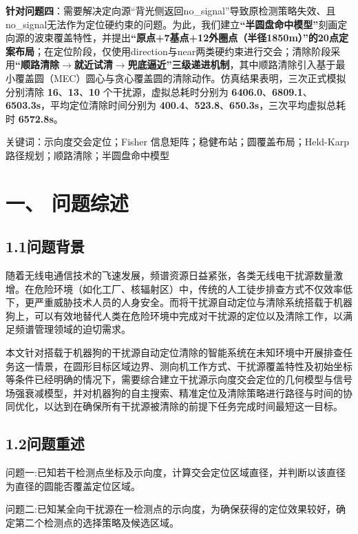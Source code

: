\documentclass[UTF8, zihao=5,AutoFakeBold=2]{ctexart}
\begin{document}
\textbf{针对问题四}：需要解决定向源“背光侧返回no\_signal”导致原检测策略失效、且no\_signal无法作为定位硬约束的问题。为此，我们建立\textbf{“半圆盘命中模型”}刻画定向源的波束覆盖特性，并提出\textbf{“原点+7基点+12外圈点（半径1850m）”的20点定案布局}；在定位阶段，仅使用direction与near两类硬约束进行交会；清除阶段采用\textbf{“顺路清除\(\to\)就近试清\(\to\)兜底逼近”三级递进机制}，其中顺路清除引入基于最小覆盖圆（MEC）圆心与贪心覆盖圆的清除动作。仿真结果表明，三次正式模拟分别清除 \textbf{16}、\textbf{13}、\textbf{10} 个干扰源，虚拟总耗时分别为 \textbf{6406.0}、\textbf{6809.1}、\textbf{6503.3s}，平均定位清除时间分别为 \textbf{400.4}、\textbf{523.8}、\textbf{650.3s}，三次平均虚拟总耗时 \textbf{6572.8s}。

	\vspace{1cm}
	{\heiti 关键词：}示向度交会定位；Fisher 信息矩阵；稳健布站；圆覆盖布局；Held-Karp 路径规划；顺路清除；半圆盘命中模型

\newpage
\section*{一、 问题综述}
	\subsection*{1.1问题背景}
	随着无线电通信技术的飞速发展，频谱资源日益紧张，各类无线电干扰源数量激增。在危险环境（如化工厂、核辐射区）中，传统的人工徒步排查方式不仅效率低下，更严重威胁技术人员的人身安全。而将干扰源自动定位与清除系统搭载于机器狗上，可以有效地替代人类在危险环境中完成对干扰源的定位以及清除工作，以满足频谱管理领域的迫切需求。
	
	本文针对搭载于机器狗的干扰源自动定位清除的智能系统在未知环境中开展排查任务这一情景，在圆形目标区域边界、测向机工作方式、干扰源覆盖特性及初始坐标等条件已经明确的情况下，需要综合建立干扰源示向度交会定位的几何模型与信号场强衰减模型，并对机器狗的自主搜索、精准定位及清除策略进行路径与时间的协同优化，以达到在确保所有干扰源被清除的前提下任务完成时间最短这一目标。
	
	\subsection*{1.2问题重述}
	
		问题一:\quad 已知若干检测点坐标及示向度，计算交会定位区域直径，并判断以该直径为直径的圆能否覆盖定位区域。
		
		问题二:\quad 已知某全向干扰源在一检测点的示向度，为确保获得的定位效果较好，确定第二个检测点的选择策略及候选区域。
		
\end{document}
